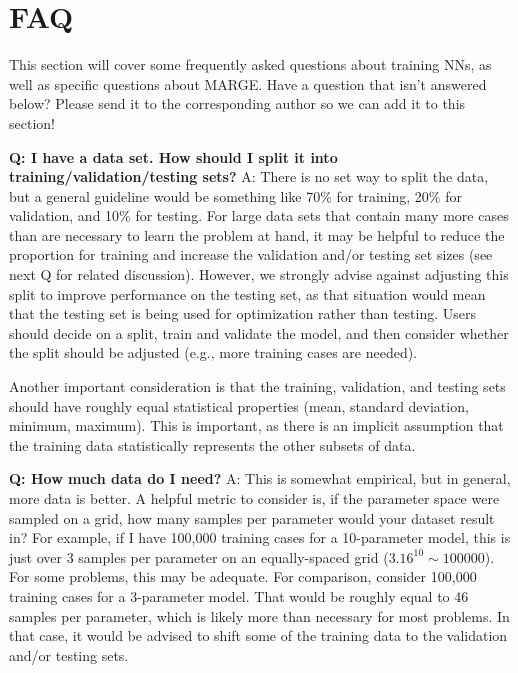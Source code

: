 \documentclass[letterpaper, 12pt]{article}
\begin{document}
\section{FAQ}

This section will cover some frequently asked questions about training NNs, 
as well as specific questions about MARGE.  Have a question that isn't 
answered below?  Please send it to the corresponding author so we can add 
it to this section! \newline

\noindent \textbf{Q: I have a data set.  How should I split it into 
training/validation/testing sets?}  A: There is no set way to split the data, 
but a general guideline would be something like 70\% for training, 20\% for 
validation, and 10\% for testing.  For large data sets that contain many more 
cases than are necessary to learn the problem at hand, it may be helpful to 
reduce the proportion for training and increase the validation and/or testing 
set sizes (see next Q for related discussion).  However, we strongly advise 
against adjusting this split to improve
performance on the testing set, as that situation would mean that the testing 
set is being used for optimization rather than testing.  Users should decide 
on a split, train and validate the model, and then consider whether the split 
should be adjusted (e.g., more training cases are needed).  \newline 

\noindent Another important 
consideration is that the training, validation, and testing sets should have 
roughly equal statistical properties (mean, standard deviation, minimum, 
maximum).  This is important, as there is an implicit assumption that the 
training data statistically represents the other subsets of data.\newline

\noindent \textbf{Q: How much data do I need?} A: This is somewhat empirical, 
but in general, more data is better.  A helpful metric to consider is, if the 
parameter space were sampled on a grid, how many samples per parameter would 
your dataset result in?  For example, if I have 100,000 training cases for a 
10-parameter model, this is just over 3 samples per parameter on an 
equally-spaced grid ($3.16^{10} \sim 100000$).  For some problems, this may be 
adequate.  For comparison, consider 100,000 training cases for a 3-parameter 
model.  That would be roughly equal to 46 samples per parameter, which is 
likely more than necessary for most problems.  In that case, it would be 
advised to shift some of the training data to the validation and/or testing 
sets. \newline
\end{document}
